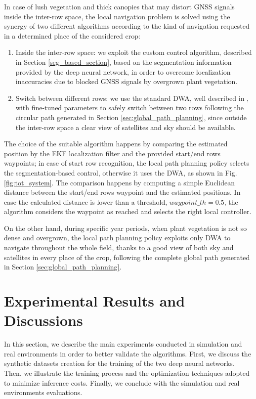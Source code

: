 \documentclass[journal]{IEEEtran}
\begin{document}
In case of lush vegetation and thick canopies that may distort GNSS signals inside the inter-row space, the local navigation problem is solved using the synergy of two different algorithms according to the kind of navigation requested in a determined place of the considered crop:
\begin{enumerate}
    \item Inside the inter-row space: we exploit the custom control algorithm, described in Section \ref{seg_based_section}, based on the segmentation information provided by the deep neural network, in order to overcome localization inaccuracies due to blocked GNSS signals by overgrown plant vegetation.
    \item Switch between different rows: we use the standard DWA, well described in \cite{dwa}, with fine-tuned parameters to safely switch between two rows following the circular path generated in Section \ref{sec:global_path_planning}, since outside the inter-row space a clear view of satellites and sky should be available.
\end{enumerate}
The choice of the suitable algorithm happens by comparing the estimated position by the EKF localization filter and the provided start/end rows waypoints; in case of start row recognition, the local path planning policy selects the segmentation-based control, otherwise it uses the DWA, as shown in Fig. \ref{fig:tot_system}. The comparison happens by computing a simple Euclidean distance between the start/end rows waypoint and the estimated positions. In case the calculated distance is lower than a threshold, $waypoint\_th=0.5$, the algorithm considers the waypoint as reached and selects the right local controller.

On the other hand, during specific year periods, when plant vegetation is not so dense and overgrown, the local path planning policy exploits only DWA to navigate throughout the whole field, thanks to a good view of both sky and satellites in every place of the crop, following the complete global path generated in Section \ref{sec:global_path_planning}.

\section{Experimental Results and Discussions}
\label{algorithm_testing}
In this section, we describe the main experiments conducted in simulation and real environments in order to better validate the algorithms. First, we discuss the synthetic datasets creation for the training of the two deep neural networks. Then, we illustrate the training process and the optimization techniques adopted to minimize inference costs. Finally, we conclude with the simulation and real environments evaluations.
\end{document}
